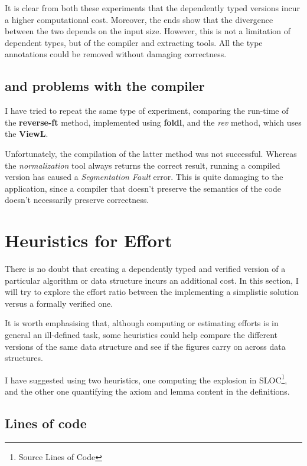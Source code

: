 \documentclass[12pt,twoside,notitlepage]{report}
\begin{document}
It is clear from both these experiments that the dependently typed versions incur a higher computational cost. Moreover, the ends show that the divergence between the two depends on the input size.  However, this is not a limitation of dependent types, but of the compiler and extracting tools. All the type annotations could be removed without damaging correctness.

\subsection{ and problems with the compiler}

I have tried to repeat the same type of experiment, comparing the run-time of the \textbf{reverse-ft} method, implemented using \textbf{foldl}, and the \textit{rev} method, which uses the \textbf{ViewL}.

Unfortunately, the compilation of the latter method was not successful. Whereas the \textit{normalization} tool always returns the correct result, running a compiled version has caused a \textit{Segmentation Fault} error. This is quite damaging to the application, since a compiler that doesn't preserve the semantics of the code doesn't necessarily preserve correctness. 

\section{Heuristics for Effort}

There is no doubt that creating a dependently typed and verified version of a particular algorithm or data structure incurs an additional cost. In this section, I will try to explore the effort ratio between the implementing a simplistic solution versus a formally verified one. 

It is worth emphasising that, although computing or estimating efforts is in general an ill-defined task, some heuristics could help compare the different versions of the same data structure and see if the figures carry on across data structures.

I have suggested using two heuristics, one computing the explosion in SLOC\footnote{Source Lines of Code}, and the other one quantifying the axiom and lemma content in the definitions.

\subsection{Lines of code}
\end{document}

